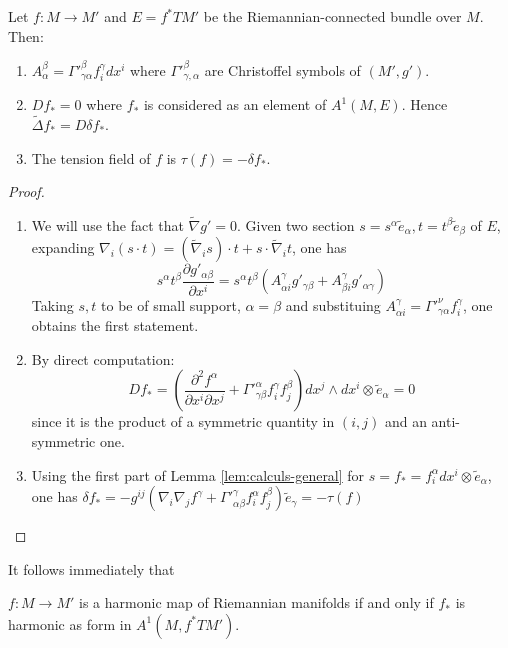 \begin{proposition}
\label{prop:calculs-pullback-tangent}
Let \(f: M \longrightarrow M'\) and \(E = f^* TM'\) be the Riemannian-connected bundle
over \(M\). Then:
\begin{enumerate}
\item \(A^\beta_\alpha = \Gamma'^{\beta}_{\gamma\alpha} f_i^\gamma dx^i\) where \(\Gamma'^{\beta}_{\gamma,\alpha}\) are Christoffel symbols of \((M',g')\).
\item \(Df_* = 0\) where \(f_*\) is considered as an element of \(A^1(M,E)\). Hence \(\tilde\Delta f_*= D\delta f_*\).
\item The tension field of \(f\) is \(\tau (f) = -\delta f_*\).
\end{enumerate}
\end{proposition}
\begin{proof}
\begin{enumerate}
\item We will use the fact that \(\tilde\nabla g' = 0\). Given two section \(s=s^\alpha
   \tilde e_\alpha,t=t^\beta \tilde e_\beta\) of \(E\), expanding
\(\nabla_i(s\cdot t) = (\tilde\nabla_i s)\cdot t +s\cdot \tilde\nabla_i t\), one has
\[ 
   s^\alpha t^\beta \frac{\partial g'_{\alpha\beta}}{\partial x^i} = s^\alpha t^\beta
   \left( A^\gamma_{\alpha i} g'_{\gamma\beta} + A^\gamma_{\beta i} g'_{\alpha\gamma}\right)
   \]
Taking \(s,t\) to be of small support, \(\alpha=\beta\) and substituing \(A^\gamma_{\alpha i} = \Gamma'^\nu_{\gamma\alpha}f^\gamma_i\), one obtains the first statement.
\item By direct computation:
\[
    D f_* = \left(\frac{\partial^2 f^\alpha}{\partial x^i \partial x^j} +
   \Gamma'^\alpha_{\gamma\beta} f^\gamma_i f^\beta_j \right)dx^j\wedge dx^i\otimes
   \tilde e_\alpha = 0 
   \]
since it is the product of a symmetric quantity in \((i,j)\) and an anti-symmetric one.
\item Using the first part of Lemma \ref{lem:calculs-general} for \(s=f_* = f^\alpha_i dx^i\otimes
   \tilde e_\alpha\), one has \(\delta f_* = -g^{ij}\left(\nabla_i\nabla_j f^\gamma +
   \Gamma'^\gamma_{\alpha\beta} f^\alpha_i f^\beta_j\right)\tilde e_\gamma=-\tau(f)\)
\end{enumerate}
\end{proof}

It follows immediately that
\begin{corollary}
\(f: M \longrightarrow M'\) is a harmonic map of Riemannian manifolds if and only if \(f_*\) is harmonic as form in \(A^1(M,f^* TM')\).
\end{corollary}

